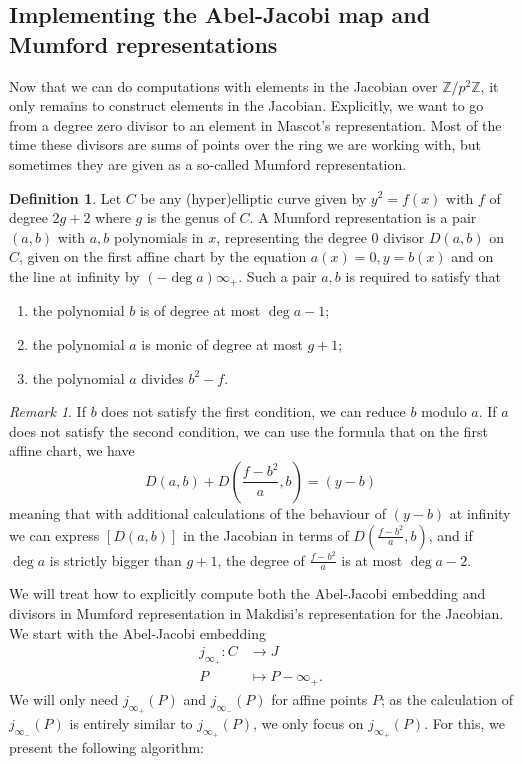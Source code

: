\documentclass[12pt]{article}
\newcommand{\Z}{\mathbb{Z}}
\theoremstyle{plain}
\theoremstyle{definition}
\newtheorem{defn}[thm]{Definition} %
\theoremstyle{remark}
\newtheorem{rem}[thm]{Remark} %
\begin{document}
\subsection{Implementing the Abel-Jacobi map and Mumford representations}
Now that we can do computations with elements in the Jacobian over $\Z/p^2\Z$, it only remains to construct elements in the Jacobian. Explicitly, we want to go from a degree zero divisor to an element in Mascot's representation. Most of the time these divisors are sums of points over the ring we are working with, but sometimes they are given as a so-called Mumford representation.
\begin{defn}
Let $C$ be any (hyper)elliptic curve given by $y^2 = f(x)$ with $f$ of degree $2g+2$ where $g$ is the genus of $C$. A Mumford representation is a pair $(a,b)$ with $a,b$ polynomials in $x$, representing the degree $0$ divisor $D(a,b)$ on $C$, given on the first affine chart by the equation $a(x) = 0, y = b(x)$ and on the line at infinity by $(-\deg a)\infty_+$. Such a pair $a,b$ is required to satisfy that
\begin{enumerate}
\item the polynomial $b$ is of degree at most $\deg a -1$;
\item the polynomial $a$ is monic of degree at most $g+1$;
\item the polynomial $a$ divides $b^2 - f$.
\end{enumerate}
\end{defn}
\begin{rem}
If $b$ does not satisfy the first condition, we can reduce $b$ modulo $a$. If $a$ does not satisfy the second condition, we can use the formula that on the first affine chart, we have
\[
D(a,b) + D\left(\frac{f-b^2}{a},b\right) = (y-b)
\]
meaning that with additional calculations of the behaviour of $(y-b)$ at infinity we can express $[D(a,b)]$ in the Jacobian in terms of $D(\frac{f-b^2}{a},b)$, and if $\deg a$ is strictly bigger than $g+1$, the degree of $\frac{f-b^2}{a}$ is at most $\deg a -2$.
\end{rem}

We will treat how to explicitly compute both the Abel-Jacobi embedding and divisors in Mumford representation in Makdisi's representation for the Jacobian. We start with the Abel-Jacobi embedding 
\begin{align*}
j_{\infty_+}: C &\to J \\
              P &\mapsto P-\infty_+.
\end{align*}
We will only need $j_{\infty_+}(P)$ and $j_{\infty_-}(P)$ for affine points $P$; as the calculation of $j_{\infty_-}(P)$ is entirely similar to $j_{\infty_+}(P)$, we only focus on $j_{\infty_+}(P)$. For this, we present the following algorithm:
\end{document}
